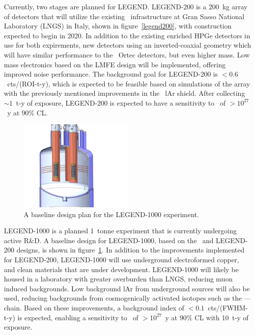 \documentclass[/main.tex]{subfiles}
\begin{document}
Currently, two stages are planned for LEGEND.
LEGEND-200 is a 200~kg array of detectors that will utilize the existing \Gerda\ infrastructure at Gran Sasso National Laboratory (LNGS) in Italy, shown in figure~\ref{legend200}, with construction expected to begin in 2020.
In addition to the existing enriched HPGe detectors in use for both expirements, new detectors using an inverted-coaxial geometry which will have similar performance to the \MJD\ Ortec detectors, but even higher mass.
Low mass electronics based on the LMFE design will be implemented, offering improved noise performance.
The background goal for LEGEND-200 is $<0.6$~cts/(ROI-t-y), which is expected to be feasible based on simulations of the array with the previously mentioned improvements in the \Gerda\ lAr shield.
After collecting $\sim1$~t-y of exposure, LEGEND-200 is expected to have a sensitivity to  \znbb\ of $>10^{27}$~y at 90\% CL.
\\
\begin{figure}
  \centering
  \includegraphics[width=0.5\textwidth]{legend1000}
  \caption[Legend-1000 experimental design]{\label{legend1000}
    A baseline design plan for the LEGEND-1000 experiment.
  }
\end{figure}
LEGEND-1000 is a planned 1~tonne experiment that is currently undergoing active R\&D.
A baseline design for LEGEND-1000, based on the \Gerda\ and LEGEND-200 designs, is shown in figure~\ref{legend1000}.
In addition to the improvements implemented for LEGEND-200, LEGEND-1000 will use underground electroformed copper, and clean materials that are under development.
LEGEND-1000 will likely be housed in a laboratory with greater overburden than LNGS, reducing muon induced backgrounds.
Low background lAr from underground sources will also be used, reducing backgrounds from cosmogenically activated isotopes such as the ---- chain.
Based on these improvements, a background index of $<0.1$~cts/(FWHM-t-y) is expected, enabling a sensitivity to  \znbb\ of $>10^{27}$~y at 90\% CL with 10~t-y of exposure.

\onlyinsubfile{
  
  
}
\end{document}
